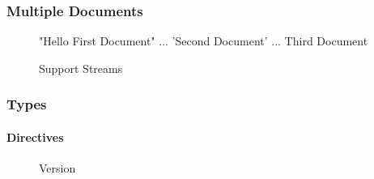 \subsubsection{Multiple Documents}

\begin{figure}[H]
  \begin{minipage}[t]{0.48\textwidth}
    \vspace{0pt}
    \begin{bchart}[max=9, width=0.85\textwidth]
    \end{bchart}
  \end{minipage}
  \begin{minipage}[t]{0.48\textwidth}
    \vspace{0pt}
    \begin{yamlcode}
      "Hello First Document"
      ...
      'Second Document'
      ...
      Third Document
    \end{yamlcode}
  \end{minipage}
  \caption{Support Streams}
\end{figure}

\subsubsection{Types}

\paragraph{Directives}

\begin{figure}[H]
  \begin{minipage}[t]{0.48\textwidth}
    \vspace{0pt}
    \begin{bchart}[max=9, width=0.85\textwidth]
    \end{bchart}
  \end{minipage}
  \begin{minipage}[t]{0.48\textwidth}
    \vspace{0pt}
    \begin{yamlcode}
    \end{yamlcode}
  \end{minipage}
  \caption{ Version}
\end{figure}

